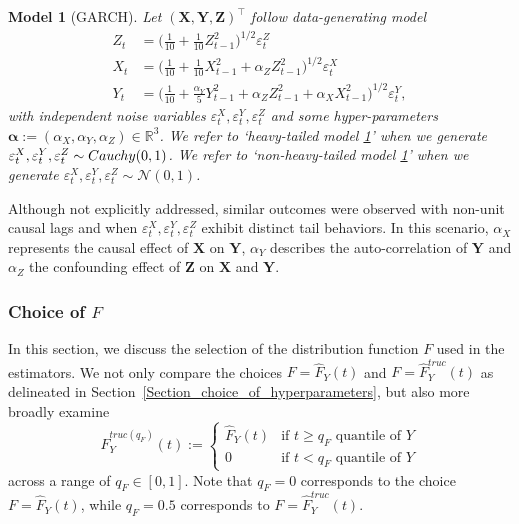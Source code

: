\documentclass[a4paper,11pt]{article}
\newtheorem{model}{Model}
\begin{document}
\begin{model}[GARCH]
\label{GARCH_time_series_definition}
Let $(\mathbf{X,Y,Z})^\top$ follow data-generating model
\begin{align*}
Z_t&= \bigg(\frac{1}{10}+\frac{1}{10}Z_{t-1}^2 \bigg)^{1/2} \varepsilon^Z_t \\
X_t&= \bigg(\frac{1}{10}+\frac{1}{10}X_{t-1}^2 +  \alpha_Z Z_{t-1}^2  \bigg)^{1/2}\varepsilon^X_t \\
Y_t&= \bigg(\frac{1}{10} + \frac{\alpha_Y}{5}Y_{t-1}^2 +  \alpha_Z Z_{t-1}^2 +  \alpha_{X}X_{t-1}^2   \bigg)^{1/2}\varepsilon^Y_t,
\end{align*}
with independent noise variables $\varepsilon_t^X,  \varepsilon_t^Y, \varepsilon_t^Z$ and some hyper-parameters  $\boldsymbol{\alpha}:=(\alpha_X, \alpha_Y, \alpha_Z)\in\mathbb{R}^3$. We refer to `heavy-tailed model \ref{GARCH_time_series_definition}' when we generate  $\varepsilon_t^X,  \varepsilon_t^Y, \varepsilon_t^Z\sim {\rm Cauchy}(0,1)$. We refer to `non-heavy-tailed model \ref{GARCH_time_series_definition}' when we generate  $\varepsilon_t^X,  \varepsilon_t^Y, \varepsilon_t^Z\sim \mathcal{N}(0,1)$. 
\end{model}
Although not explicitly addressed, similar outcomes were observed with non-unit causal lags and when $\varepsilon_t^X, \varepsilon_t^Y, \varepsilon_t^Z$ exhibit distinct tail behaviors. In this scenario, $\alpha_X$ represents the causal effect of $\textbf{X}$ on $\textbf{Y}$, $\alpha_Y$ describes the auto-correlation of $\textbf{Y}$ and $\alpha_Z$ the confounding effect of $\textbf{Z}$ on $\textbf{X}$ and $ \textbf{Y}$.


\subsubsection[Choice of F]{Choice of $F$}
\label{Section_choice_F_{}}
In this section, we discuss the selection of the distribution function $F$ used in the estimators. We not only compare the choices $F = \hat{F}_Y(t)$ and $F = \hat{F}^{truc}_Y(t)$ as delineated in Section~\ref{Section_choice_of_hyperparameters}, but also more broadly examine
    \[  \hat{F}_Y^{truc(q_F)}(t):= \begin{cases} \hat{F}_Y(t) & \text{if } t \geq q_F \text{  quantile of }Y \\ 0 & \text{if } t < q_F \text{  quantile of }Y \end{cases} \]
across a range of $q_F\in [0,1]$. Note that $q_F=0$ corresponds to the choice $F = \hat{F}_Y(t)$, while $q_F=0.5$ corresponds to $F = \hat{F}^{truc}_Y(t)$.
\end{document}
